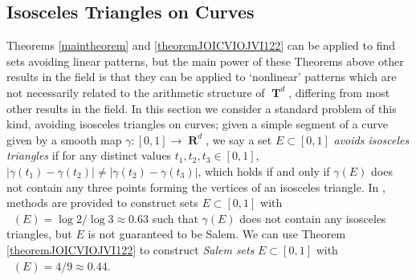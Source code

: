 \documentclass[dvipsnames,letterpaper,12pt]{article}
\numberwithin{equation}{section}
\DeclareMathOperator{\hausdim}{\dim_{\mathbf{H}}}
\DeclareMathOperator{\fordim}{\dim_{\mathbf{F}}}
\DeclareMathOperator{\RR}{\mathbf{R}}
\DeclareMathOperator{\TT}{\mathbf{T}}
\numberwithin{theorem}{section}
\begin{document}
\subsection{Isosceles Triangles on Curves}

Theorems \ref{maintheorem} and \ref{theoremJOICVIOJVI122} can be applied to find sets avoiding linear patterns, but the main power of these Theorems above other results in the field is that they can be applied to `nonlinear' patterns which are not necessarily related to the arithmetic structure of $\TT^d$, differing from most other results in the field. In this section we consider a standard problem of this kind, avoiding isosceles triangles on curves; given a simple segment of a curve given by a smooth map $\gamma : [0,1] \to \RR^d$, we say a set $E \subset [0,1]$ \emph{avoids isosceles triangles} if for any distinct values $t_1,t_2,t_3 \in [0,1]$, $|\gamma(t_1) - \gamma(t_2)| \neq |\gamma(t_2) - \gamma(t_3)|$, which holds if and only if $\gamma(E)$ does not contain any three points forming the vertices of an  isosceles triangle. In \cite{PramanikFraser}, methods are provided to construct sets $E \subset [0,1]$ with $\hausdim(E) = \log 2 / \log 3 \approx 0.63$ such that $\gamma(E)$ does not contain any isosceles triangles, but $E$ is not guaranteed to be Salem. We can use Theorem \ref{theoremJOICVIOJVI122} to construct \emph{Salem sets} $E \subset [0,1]$ with $\fordim(E) = 4/9 \approx 0.44$.
\end{document}
